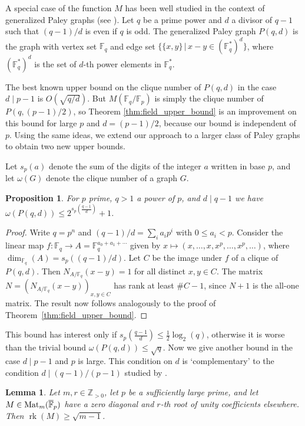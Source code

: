 \documentclass{amsart}
\theoremstyle{plain}
\newtheorem{lemma}[theorem]{Lemma}
\newtheorem{proposition}[theorem]{Proposition}
\theoremstyle{definition}
\DeclareMathOperator{\rk}{rk}
\newcommand{\Z}{\ensuremath{\mathbb{Z}}}
\newcommand{\F}{\ensuremath{\mathbb{F}}}
\begin{document}
A special case of the function \(M\) has been well studied in the context of generalized Paley graphs (see \cite{PaleyGraphs}).
Let $q$ be a prime power and $d$ a divisor of $q-1$ such that $(q-1)/d$ is even if $q$ is odd. 
The generalized Paley graph $P(q,d)$ is the graph with vertex set $\F_q$ and edge set $\{\{x,y\}\,|\,x-y\in(\F_q^*)^d\}$, where $(\F_q^*)^d$ is the set of $d$-th power elements in $\F_q^*$.

The best known upper bound on the clique number of $P(q,d)$ in the case $d\mid p-1$ is $O(\sqrt{q/d})$.
But $M(\F_q/\F_p)$ is simply the clique number of $P(q,(p-1)/2)$, so Theorem \ref{thm:field_upper_bound} is an improvement on this bound for large \(p\) and \(d=(p-1)/2\), because our bound is independent of $p$.  
Using the same ideas, we extend our approach to a larger class of Paley graphs to obtain two new upper bounds.

Let $s_p(a)$ denote the sum of the digits of the integer $a$ written in base $p$, and let \(\omega(G)\) denote the clique number of a graph \(G\).

\begin{proposition}
	For \(p\) prime, \(q>1\) a power of \(p\), and \(d\mid q-1\) we have $\omega(P(q,d))\le 2^{s_p(\frac{q-1}{d})}+1$.
\end{proposition}

\begin{proof}
	Write \(q=p^n\) and \((q-1)/d=\sum_i a_i p^i\) with \(0\leq a_i < p\).
	Consider the linear map \(f:\F_q\to A=\F_q^{a_0+a_1+\dotsm}\) given by \(x\mapsto (x,\dotsc,x,x^p,\dotsc,x^p,\dotsc)\), where \(\dim_{\F_q}(A)=s_p((q-1)/d)\).
	Let \(C\) be the image under \(f\) of a clique of \(P(q,d)\).
	Then \(N_{A/\F_q}(x-y)=1\) for all distinct \(x,y\in C\). The matrix \(N=(N_{A/\F_q}(x-y))_{x,y\in C}\) has rank at least \(\#C-1\), since \(N+1\) is the all-one matrix. 
	The result now follows analogously to the proof of Theorem~\ref{thm:field_upper_bound}.
\end{proof}

This bound has interest only if $s_p(\frac{q-1}{d})\le \frac{1}{2}\log_2(q)$, otherwise it is worse than the trivial bound $\omega(P(q,d))\le\sqrt{q}$. Now we give another bound in the case $d\mid p-1$ and $p$ is large. This condition on \(d\) is `complementary' to the condition \(d\mid(q-1)/(p-1)\) studied by \cite{PaleyGraphs}.

\begin{lemma}\label{lem:ugly_matrix_cyclotomic}
	Let $m,r\in\Z_{>0}$, let \(p\) be a sufficiently large prime, and let $M\in\textup{Mat}_m(\overline{\F}_p)$ have a zero diagonal and $r$-th root of unity coefficients elsewhere. Then $\rk(M)\ge \sqrt{m-1}$.
\end{lemma}
\end{document}
